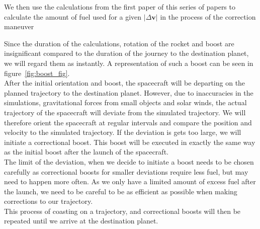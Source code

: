 \documentclass[reprint,english,notitlepage]{revtex4-2}
\begin{document}
    We then use the calculations from the first paper %
    of this series of papers to calculate the amount of fuel used for a given $|\Delta\textbf{v}|$ in the process of the correction maneuver

    Since the duration of the calculations, rotation of the rocket and boost are insignificant compared to the duration of the journey to the destination planet, we will regard them as instantly.
    A representation of such a boost can be seen in figure~\ref{fig:boost_fig}.\\

    After the initial orientation and boost, the spacecraft will be departing on the planned trajectory to the destination planet.
    However, due to inaccuracies in the simulations, gravitational forces from small objects and solar winds, the actual trajectory of the spacecraft will deviate from the simulated trajectory.
    We will therefore orient the spacecraft at regular intervals and compare the position and velocity to the simulated trajectory.
    If the deviation is gets too large, we will initiate a correctional boost.
    This boost will be executed in exactly the same way as the initial boost after the launch of the spacecraft.\\

    The limit of the deviation, when we decide to initiate a boost needs to be chosen carefully as correctional boosts for smaller deviations require less fuel, but may need to happen more often.
    As we only have a limited amount of excess fuel after the launch, we need to be careful to be as efficient as possible when making corrections to our trajectory.\\
    This process of coasting on a trajectory, and correctional boosts will then be repeated until we arrive at the destination planet.
\end{document}
